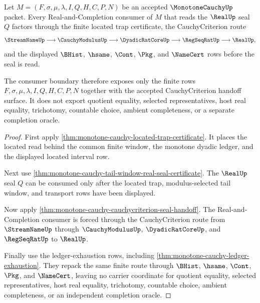 \begin{theorem}
\label{thm:monotone-cauchy-located-real-completion-handoff}
Let $M=(F,\sigma,\mu,\lambda,I,Q,H,C,P,N)$ be an accepted $\MonotoneCauchyUp$ packet. Every Real-and-Completion consumer of $M$ that reads the $\RealUp$ seal $Q$ factors through the finite located trap certificate, the CauchyCriterion route
$$
\StreamNameUp
\longrightarrow
\CauchyModulusUp
\longrightarrow
\DyadicRatCoreUp
\longrightarrow
\RegSeqRatUp
\longrightarrow
\RealUp,
$$
and the displayed $\BHist$, $\hsame$, $\Cont$, $\Pkg$, and $\NameCert$ rows before the seal is read.

The consumer boundary therefore exposes only the finite rows $F,\sigma,\mu,\lambda,I,Q,H,C,P,N$ together with the accepted CauchyCriterion handoff surface. It does not export quotient equality, selected representatives, host real equality, trichotomy, countable choice, ambient completeness, or a separate completion oracle.
\end{theorem}
\begin{proof}
First apply \autoref{thm:monotone-cauchy-located-trap-certificate}. It places the located read behind the common finite window, the monotone dyadic ledger, and the displayed located interval row.

Next use \autoref{thm:monotone-cauchy-tail-window-real-seal-certificate}. The $\RealUp$ seal $Q$ can be consumed only after the located trap, modulus-selected tail window, and transport rows have been displayed.

Now apply \autoref{thm:monotone-cauchy-cauchycriterion-seal-handoff}. The Real-and-Completion consumer is forced through the CauchyCriterion route from $\StreamNameUp$ through $\CauchyModulusUp$, $\DyadicRatCoreUp$, and $\RegSeqRatUp$ to $\RealUp$.

Finally use the ledger-exhaustion rows, including \autoref{thm:monotone-cauchy-ledger-exhaustion}. They repack the same finite route through $\BHist$, $\hsame$, $\Cont$, $\Pkg$, and $\NameCert$, leaving no carrier coordinate for quotient equality, selected representatives, host real equality, trichotomy, countable choice, ambient completeness, or an independent completion oracle.
\end{proof}


